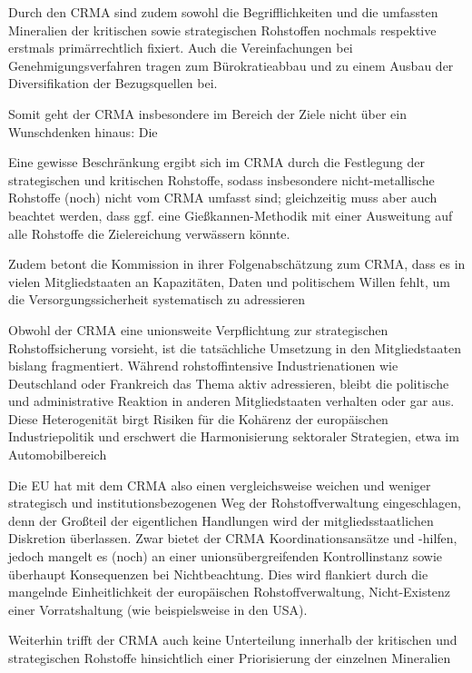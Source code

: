 \documentclass[12pt,a4paper,oneside]{book} %
\begin{document}
Durch den CRMA sind zudem sowohl die Begrifflichkeiten und die umfassten Mineralien der kritischen sowie strategischen Rohstoffen nochmals respektive erstmals primärrechtlich fixiert. Auch die Vereinfachungen bei Genehmigungsverfahren tragen zum Bürokratieabbau und zu einem Ausbau der Diversifikation der Bezugsquellen bei.

Somit geht der CRMA insbesondere im Bereich der Ziele nicht über ein Wunschdenken hinaus: Die 

Eine gewisse Beschränkung ergibt sich im CRMA durch die Festlegung der strategischen und kritischen Rohstoffe, sodass insbesondere nicht-metallische Rohstoffe (noch) nicht vom CRMA umfasst sind; gleichzeitig muss aber auch beachtet werden, dass ggf. eine Gießkannen-Methodik mit einer Ausweitung auf alle Rohstoffe die Zielereichung verwässern könnte.


Zudem betont die Kommission in ihrer Folgenabschätzung zum CRMA, dass es in vielen Mitgliedstaaten an Kapazitäten, Daten und politischem Willen fehlt, um die Versorgungssicherheit systematisch zu adressieren

Obwohl der CRMA eine unionsweite Verpflichtung zur strategischen Rohstoffsicherung vorsieht, ist die tatsächliche Umsetzung in den Mitgliedstaaten bislang fragmentiert. Während rohstoffintensive Industrienationen wie Deutschland oder Frankreich das Thema aktiv adressieren, bleibt die politische und administrative Reaktion in anderen Mitgliedstaaten verhalten oder gar aus. Diese Heterogenität birgt Risiken für die Kohärenz der europäischen Industriepolitik und erschwert die Harmonisierung sektoraler Strategien, etwa im Automobilbereich

Die EU hat mit dem CRMA also einen vergleichsweise weichen und weniger strategisch und institutionsbezogenen Weg der Rohstoffverwaltung eingeschlagen, denn der Großteil der eigentlichen Handlungen wird der mitgliedsstaatlichen Diskretion überlassen. Zwar bietet der CRMA Koordinationsansätze und -hilfen, jedoch mangelt es (noch) an einer unionsübergreifenden Kontrollinstanz sowie überhaupt Konsequenzen bei Nichtbeachtung. Dies wird flankiert durch die mangelnde Einheitlichkeit der europäischen Rohstoffverwaltung, Nicht-Existenz einer Vorratshaltung (wie beispielsweise in den USA).

Weiterhin trifft der CRMA auch keine Unterteilung innerhalb der kritischen und strategischen Rohstoffe hinsichtlich einer Priorisierung der einzelnen Mineralien
\end{document}

